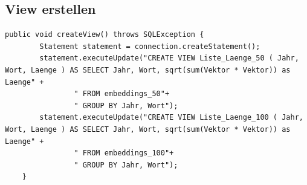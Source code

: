 \subsection{View erstellen}
\begin{lstlisting}[style=Java]
public void createView() throws SQLException {
        Statement statement = connection.createStatement();
        statement.executeUpdate("CREATE VIEW Liste_Laenge_50 ( Jahr, Wort, Laenge ) AS SELECT Jahr, Wort, sqrt(sum(Vektor * Vektor)) as Laenge" +
                " FROM embeddings_50"+
                " GROUP BY Jahr, Wort");
        statement.executeUpdate("CREATE VIEW Liste_Laenge_100 ( Jahr, Wort, Laenge ) AS SELECT Jahr, Wort, sqrt(sum(Vektor * Vektor)) as Laenge" +
                " FROM embeddings_100"+
                " GROUP BY Jahr, Wort");
    }
\end{lstlisting}

